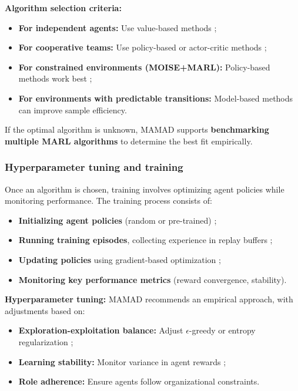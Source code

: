 \documentclass[pdflatex,sn-mathphys-num]{sn-jnl}%
\theoremstyle{thmstyleone}%
\theoremstyle{thmstyletwo}%
\theoremstyle{thmstylethree}%
\begin{document}
\noindent \textbf{Algorithm selection criteria:}
\begin{itemize}
    \item \textbf{For independent agents:} Use value-based methods ;
    \item \textbf{For cooperative teams:} Use policy-based or actor-critic methods ;
    \item \textbf{For constrained environments (MOISE+MARL):} Policy-based methods work best ;
    \item \textbf{For environments with predictable transitions:} Model-based methods can improve sample efficiency.
\end{itemize}

\noindent If the optimal algorithm is unknown, MAMAD supports \textbf{benchmarking multiple MARL algorithms} to determine the best fit empirically.

\subsubsection{Hyperparameter tuning and training}
Once an algorithm is chosen, training involves optimizing agent policies while monitoring performance. The training process consists of:
\begin{itemize}
    \item \textbf{Initializing agent policies} (random or pre-trained) ;
    \item \textbf{Running training episodes}, collecting experience in replay buffers ;
    \item \textbf{Updating policies} using gradient-based optimization ;
    \item \textbf{Monitoring key performance metrics} (reward convergence, stability).
\end{itemize}

\noindent \textbf{Hyperparameter tuning:}
MAMAD recommends an empirical approach, with adjustments based on:
\begin{itemize}
    \item \textbf{Exploration-exploitation balance:} Adjust $\epsilon$-greedy or entropy regularization ;
    \item \textbf{Learning stability:} Monitor variance in agent rewards ;
    \item \textbf{Role adherence:} Ensure agents follow organizational constraints.
\end{itemize}
\end{document}
